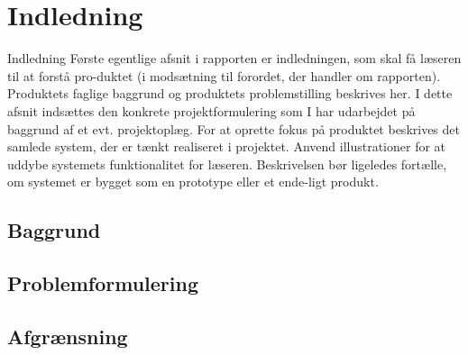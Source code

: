 \chapter{Indledning}

Indledning
Første egentlige afsnit i rapporten er indledningen, som skal få læseren til at forstå pro-duktet (i modsætning til forordet, der handler om rapporten). Produktets faglige baggrund og produktets problemstilling beskrives her.
I dette afsnit indsættes den konkrete projektformulering som I har udarbejdet på baggrund af et evt. projektoplæg.
For at oprette fokus på produktet beskrives det samlede system, der er tænkt realiseret i projektet. Anvend illustrationer for at uddybe systemets funktionalitet for læseren.
Beskrivelsen bør ligeledes fortælle, om systemet er bygget som en prototype eller et ende-ligt produkt.




\section{Baggrund}

\section{Problemformulering}

\section{Afgrænsning}
